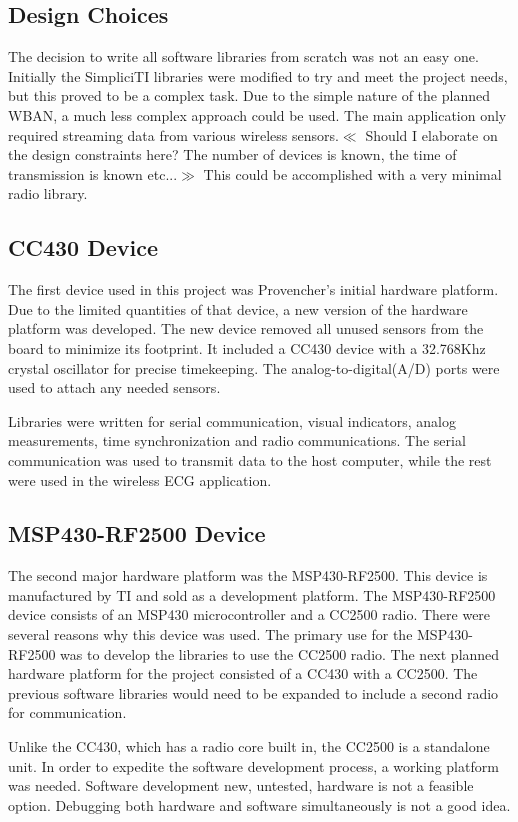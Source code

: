\documentclass{article}
\begin{document}
\subsection{Design Choices}
The decision to write all software libraries from scratch was not an easy one. Initially the SimpliciTI libraries were modified to try and meet the project needs, but this proved to be a complex task. Due to the simple nature of the planned WBAN, a much less complex approach could be used. The main application only required streaming data from various wireless sensors.$\ll$ Should I elaborate on the design constraints here? The number of devices is known, the time of transmission is known etc...$\gg$ This could be accomplished with a very minimal radio library.

\subsection{CC430 Device}
The first device used in this project was Provencher's initial hardware platform. Due to the limited quantities of that device, a new version of the hardware platform was developed. The new device removed all unused sensors from the board to minimize its footprint. It included a CC430 device with a 32.768Khz crystal oscillator for precise timekeeping. The analog-to-digital(A/D) ports were used to attach any needed sensors. 

Libraries were written for serial communication, visual indicators, analog measurements, time synchronization and radio communications. The serial communication was used to transmit data to the host computer, while the rest were used in the wireless ECG application.

\subsection{MSP430-RF2500 Device}
The second major hardware platform was the MSP430-RF2500. This device is manufactured by TI and sold as a development platform. The MSP430-RF2500 device consists of an MSP430 microcontroller and a CC2500 radio. There were several reasons why this device was used. The primary use for the MSP430-RF2500 was to develop the libraries to use the CC2500 radio. The next planned hardware platform for the project consisted of a CC430 with a CC2500. The previous software libraries would need to be expanded to include a second radio for communication.

Unlike the CC430, which has a radio core built in, the CC2500 is a standalone unit. In order to expedite the software development process, a working platform was needed. Software development new, untested, hardware is not a feasible option. Debugging both hardware and software simultaneously is not a good idea.
\end{document}
